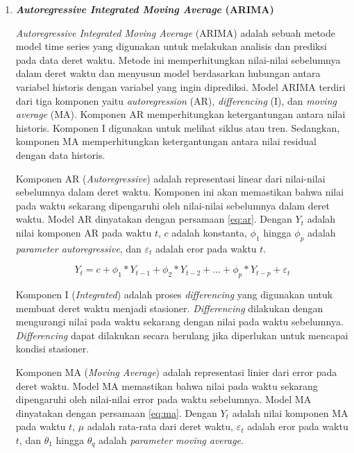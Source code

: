 \begin{enumerate}
    \item \textbf{\textit{Autoregressive Integrated Moving Average} (ARIMA)}
    
    \textit{Autoregressive Integrated Moving Average} (ARIMA) adalah sebuah metode model time series yang digunakan untuk melakukan analisis dan prediksi pada data deret waktu. Metode ini memperhitungkan nilai-nilai sebelumnya dalam deret waktu dan menyusun model berdasarkan hubungan antara variabel historis dengan variabel yang ingin diprediksi. Model ARIMA terdiri dari tiga komponen yaitu \textit{autoregression} (AR), \textit{differencing} (I), dan \textit{moving average} (MA). Komponen AR memperhitungkan ketergantungan antara nilai historis. Komponen I digunakan untuk melihat siklus atau tren. Sedangkan, komponen MA memperhitungkan ketergantungan antara nilai residual dengan data historis.

    Komponen AR (\textit{Autoregressive}) adalah representasi linear dari nilai-nilai sebelumnya dalam deret waktu. Komponen ini akan memastikan bahwa nilai pada waktu sekarang dipengaruhi oleh nilai-nilai sebelumnya dalam deret waktu. Model AR dinyatakan dengan persamaan \ref{eq:ar}. Dengan $Y_t$ adalah nilai komponen AR pada waktu $t$, $c$ adalah konstanta, $\phi_1$ hingga $\phi_p$ adalah \textit{parameter autoregressive}, dan $\varepsilon_t$ adalah eror pada waktu $t$.

    \begin{equation}
        \label{eq:ar}
        Y_t = c + \phi_1 * Y_{t-1} + \phi_2 * Y_{t-2} + ... + \phi_p * Y_{t-p} + \varepsilon_t
    \end{equation}

    Komponen I (\textit{Integrated}) adalah proses \textit{differencing} yang digunakan untuk membuat deret waktu menjadi stasioner. \textit{Differencing} dilakukan dengan mengurangi nilai pada waktu sekarang dengan nilai pada waktu sebelumnya. \textit{Differencing} dapat dilakukan secara berulang jika diperlukan untuk mencapai kondisi stasioner.

    Komponen MA (\textit{Moving Average}) adalah representasi linier dari error pada deret waktu. Model MA memastikan bahwa nilai pada waktu sekarang dipengaruhi oleh nilai-nilai error pada waktu sebelumnya. Model MA dinyatakan dengan persamaan \ref{eq:ma}. Dengan $Y_t$ adalah nilai komponen MA pada waktu $t$, $\mu$ adalah rata-rata dari deret waktu, $\varepsilon_t$ adalah eror pada waktu $t$, dan $\theta_1$ hingga $\theta_q$ adalah \textit{parameter moving average}.


\end{enumerate}
